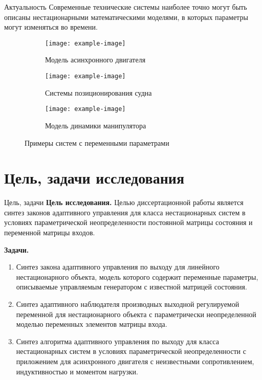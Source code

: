 \begin{frame}{Актуальность}
	\hypertarget{slide\insertframenumber}{}	
	Современные технические системы наиболее точно могут быть описаны нестационарными математическими моделями, в которых параметры могут изменяться во времени.
	
	\vspace{5mm}
	
	\begin{figure}[!h]
		\begin{subfigure}[t]{0.3\textwidth}
			\centering
			\texttt{[image: example-image]} 
			\caption{Модель асинхронного двигателя}
		\end{subfigure}
		\begin{subfigure}[t]{0.3\textwidth}
			\centering
			\texttt{[image: example-image]} 
			\caption{Системы позиционирования судна}
		\end{subfigure}
		\begin{subfigure}[t]{0.3\textwidth}
			\centering
			\texttt{[image: example-image]} 
			\caption{Модель динамики манипулятора}
		\end{subfigure}
		\vspace{2mm}
		\caption*{Примеры систем с переменными параметрами}
	\end{figure}
\end{frame}

\section*{Цель, задачи исследования}
\begin{frame}{Цель, задачи} \hypertarget{slide\insertframenumber}{}	
	\textbf{Цель исследования.}
	Целью диссертационной работы является синтез законов адаптивного управления для класса нестационарных систем в условиях параметрической неопределенности постоянной матрицы состояния и переменной матрицы входов.
	
	\vspace*{2mm}
	\textbf{Задачи.}
	\begin{enumerate}
		\item Синтез закона адаптивного управления по выходу для линейного нестационарного объекта, модель которого содержит переменные параметры, описываемые управляемым генератором с известной матрицей состояния.
		\vspace*{2mm}
		\item Синтез адаптивного наблюдателя производных выходной регулируемой переменной для нестационарного объекта с параметрически неопределенной моделью переменных элементов матрицы входа.
		\vspace*{2mm}
		\item Синтез алгоритма адаптивного управления по выходу для класса нестационарных систем в условиях параметрической неопределенности с приложением для асинхронного двигателя с неизвестными сопротивлением, индуктивностью и моментом нагрузки.
	\end{enumerate}
\end{frame}